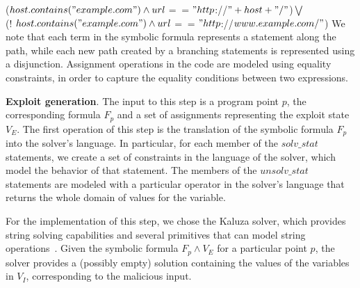 \scriptsize
($host.contains("example.com") \wedge url$$==$$"http$://$"+host+"/"$)$\bigvee$ \\
(! $host.contains("example.com") \wedge url$$==$$"http$://$www.example.com/"$)
\normalsize
We note that each term in the symbolic formula represents a statement along the path, while each new path created by a branching statements is represented using a disjunction. Assignment operations in the code are modeled using equality constraints, in order to capture the equality conditions between two expressions. 

\textbf{Exploit generation}. The input to this step is a program point $p$, the corresponding formula $F_p$ and a set of assignments representing the exploit state $V_E$. The first operation of this step is the translation of the symbolic formula $F_p$ into the solver's language. 
In particular, for each member of the $solv\_stat$ statements, we create a set of constraints in the language of the solver, which model the behavior of that statement. The members of the $unsolv\_stat$ statements are modeled with a particular operator in the solver's language that returns the whole domain of values for the variable. 

For the implementation of this step, we chose the Kaluza solver, which provides string solving capabilities and several primitives that can model string operations~\cite{kaluza}. Given the symbolic formula $F_p \wedge V_E$ for a particular point $p$, the solver provides a (possibly empty) solution containing the values of the variables in $V_I$, corresponding to the malicious input.


